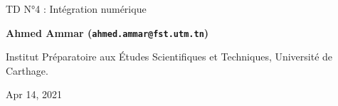 \documentclass[%
oneside,                 %
final,                   %
10pt,french]{article}
\begin{document}

\newcommand{\exercisesection}[1]{\subsection*{#1}}






\thispagestyle{empty}

\begin{center}
{\LARGE\bf
\begin{spacing}{1.25}
TD N°4 : Intégration numérique
\end{spacing}
}
\end{center}


\begin{center}
{\bf Ahmed Ammar (\texttt{ahmed.ammar@fst.utm.tn})}
\end{center}

    \begin{center}
\centerline{{\small Institut Préparatoire aux Études Scientifiques et Techniques, Université de Carthage.}}
\end{center}
    

\begin{center}
Apr 14, 2021
\end{center}

\vspace{1cm}


\tableofcontents


\vspace{1cm} %



\end{document}
